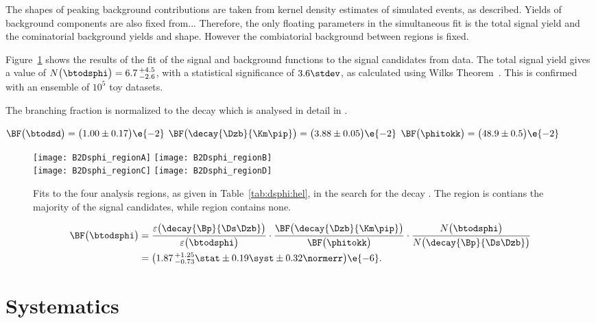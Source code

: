 The shapes of peaking background contributions are taken from kernel density
estimates of simulated events, as described.
Yields of background components are also fixed from...
Therefore, the only floating parameters in the simultaneous fit is the total signal yield and the
cominatorial background yields and shape.
However the combiatorial background between regions is fixed.

Figure~\ref{fig:dsphi:fits} shows the results of the fit of the signal and background functions to
the signal candidates from data.
The total signal yield gives a value of $N\big(\btodsphi\big)=6.7\,^{+4.5}_{-2.6}$, with a
statistical significance of $3.6\stdev$, as calculated using Wilks Theorem~\cite{wilks1938}.
This is confirmed with an ensemble of $10^5$ toy datasets.

The branching fraction is normalized to the decay \decay{\Bp}{\Ds\Dzb} which is analysed in detail
in .

$\BF\big(\btodsd\big)=\big(1.00\pm0.17\big)\e{-2}$
$\BF\big(\decay{\Dzb}{\Km\pip}\big)=\big(3.88\pm0.05\big)\e{-2}$
$\BF\big(\phitokk\big)=\big(48.9\pm0.5\big)\e{-2}$


\begin{figure}
  \begin{center}
    \texttt{[image: B2Dsphi\_regionA]}
    \texttt{[image: B2Dsphi\_regionB]}\\
    \texttt{[image: B2Dsphi\_regionC]}
    \texttt{[image: B2Dsphi\_regionD]}
    \caption{\small
      Fits to the four analysis regions, as given in Table~\ref{tab:dsphi:hel}, in the search for
      the decay \btodsphi.
      The region \rA is contians the majority of the signal candidates, while region \rD contains
      none.
    }
    \label{fig:dsphi:fits}
  \end{center}
\end{figure}





\begin{align}
  \BF\big(\btodsphi\big) &=
  \frac{\varepsilon\big(\decay{\Bp}{\Ds\Dzb}\big)}{\varepsilon\big(\btodsphi\big)}
  \cdot
  \frac{\BF\big(\decay{\Dzb}{\Km\pip}\big)}{\BF\big(\phitokk\big)}
  \cdot
  \frac{N\big(\btodsphi\big)}{N\big(\decay{\Bp}{\Ds\Dzb}\big)} \nonumber\\
  &=\big(1.87\,^{+1.25}_{-0.73}\stat\pm0.19\syst\pm0.32\normerr\big)\e{-6}.
  \label{eq:dsphi:bf}
\end{align}




\section{Systematics}















